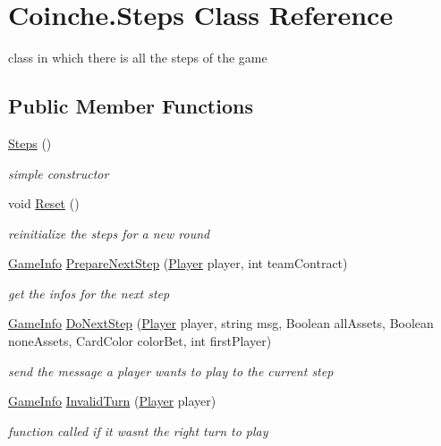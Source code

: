\hypertarget{class_coinche_1_1_steps}{}\section{Coinche.\+Steps Class Reference}
\label{class_coinche_1_1_steps}


class in which there is all the steps of the game  


\subsection*{Public Member Functions}
\begin{DoxyCompactItemize}
\item 
\hyperlink{class_coinche_1_1_steps_a7dd11c324b2f7fe132a621970681a02d}{Steps} ()
\begin{DoxyCompactList}\small\item\em simple constructor \end{DoxyCompactList}\item 
void \hyperlink{class_coinche_1_1_steps_a6d7bee3e38106357f9dd82e42e75c94a}{Reset} ()
\begin{DoxyCompactList}\small\item\em reinitialize the steps for a new round \end{DoxyCompactList}\item 
\hyperlink{class_coinche_1_1_tools_1_1_game_info}{Game\+Info} \hyperlink{class_coinche_1_1_steps_ab92a1baf655d05a75cd0b9842f4b5a36}{Prepare\+Next\+Step} (\hyperlink{class_coinche_1_1_player}{Player} player, int team\+Contract)
\begin{DoxyCompactList}\small\item\em get the infos for the next step \end{DoxyCompactList}\item 
\hyperlink{class_coinche_1_1_tools_1_1_game_info}{Game\+Info} \hyperlink{class_coinche_1_1_steps_abaae452876448173aab048ebadb2b529}{Do\+Next\+Step} (\hyperlink{class_coinche_1_1_player}{Player} player, string msg, Boolean all\+Assets, Boolean none\+Assets, Card\+Color color\+Bet, int first\+Player)
\begin{DoxyCompactList}\small\item\em send the message a player wants to play to the current step \end{DoxyCompactList}\item 
\hyperlink{class_coinche_1_1_tools_1_1_game_info}{Game\+Info} \hyperlink{class_coinche_1_1_steps_a1446affd62b6aaecafaf4959cf6f829a}{Invalid\+Turn} (\hyperlink{class_coinche_1_1_player}{Player} player)
\begin{DoxyCompactList}\small\item\em function called if it wasn\textquotesingle{}t the right turn to play \end{DoxyCompactList}\end{DoxyCompactItemize}
